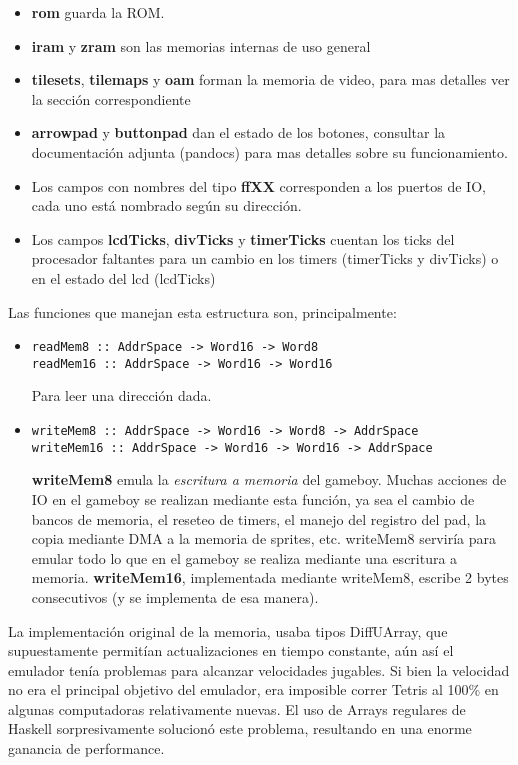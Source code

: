 \documentclass[a4paper,10pt]{report}
\begin{document}
\begin{itemize}
  \item \textbf{rom} guarda la ROM.
  \item \textbf{iram} y \textbf{zram} son las memorias internas de uso general
  \item \textbf{tilesets}, \textbf{tilemaps} y \textbf{oam} forman la memoria de video, para mas detalles ver la sección correspondiente
  \item \textbf{arrowpad} y \textbf{buttonpad} dan el estado de los botones, consultar la documentación adjunta (pandocs) para mas detalles sobre su funcionamiento.
  \item Los campos con nombres del tipo \textbf{ffXX} corresponden a los puertos de IO, cada uno está nombrado según su dirección.
  \item Los campos \textbf{lcdTicks}, \textbf{divTicks} y \textbf{timerTicks} cuentan los ticks del procesador faltantes para un cambio en los timers (timerTicks y divTicks) o en el estado del lcd (lcdTicks)
\end{itemize}
Las funciones que manejan esta estructura son, principalmente:
\begin{itemize}
  \item\begin{verbatim}
readMem8 :: AddrSpace -> Word16 -> Word8
readMem16 :: AddrSpace -> Word16 -> Word16
       \end{verbatim}
       Para leer una dirección dada.
         \item\begin{verbatim}
writeMem8 :: AddrSpace -> Word16 -> Word8 -> AddrSpace
writeMem16 :: AddrSpace -> Word16 -> Word16 -> AddrSpace
       \end{verbatim}
       \textbf{writeMem8} emula la \textit{escritura a memoria} del gameboy. Muchas acciones de IO en el gameboy se realizan mediante esta función, ya sea el cambio de bancos de memoria, el reseteo de timers, el manejo del registro del pad, la copia mediante DMA a la memoria de sprites, etc. writeMem8 serviría para emular todo lo que en el gameboy se realiza mediante una escritura a memoria. \textbf{writeMem16}, implementada mediante writeMem8, escribe 2 bytes consecutivos (y se implementa de esa manera).
\end{itemize}
La implementación original de la memoria, usaba tipos DiffUArray, que supuestamente permitían actualizaciones en tiempo constante, aún así el emulador tenía problemas para alcanzar velocidades jugables. Si bien la velocidad no era el principal objetivo del emulador, era imposible correr Tetris al 100\% en algunas computadoras relativamente nuevas. El uso de Arrays regulares de Haskell sorpresivamente solucionó este problema, resultando en una enorme ganancia de performance.\\
\end{document}
